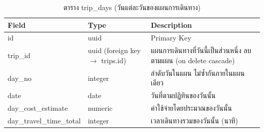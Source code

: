 \begin{table}[H]
\centering
\caption{ตาราง trip\_days (วันแต่ละวันของแผนการเดินทาง)}
\label{tab:db_tripdays}
\begin{tabular}{|p{3.6cm}|p{2.6cm}|p{6.8cm}|}
\hline
\textbf{Field} & \textbf{Type} & \textbf{Description} \\
\hline
id & uuid & Primary Key \\ \hline
trip\_id & uuid (foreign key $\to$ trips.id) & แผนการเดินทางที่วันนี้เป็นส่วนหนึ่ง ลบตามแผน (on delete cascade) \\ \hline
day\_no & integer & ลำดับวันในแผน ไม่ซ้ำกันภายในแผนเดียว \\ \hline
date & date & วันที่ตามปฏิทินของวันนั้น \\ \hline
day\_cost\_estimate & numeric & ค่าใช้จ่ายโดยประมาณของวันนั้น \\ \hline
day\_travel\_\allowbreak time\_total & integer & เวลาเดินทางรวมของวันนั้น (นาที) \\
\hline
\end{tabular}
\end{table}

